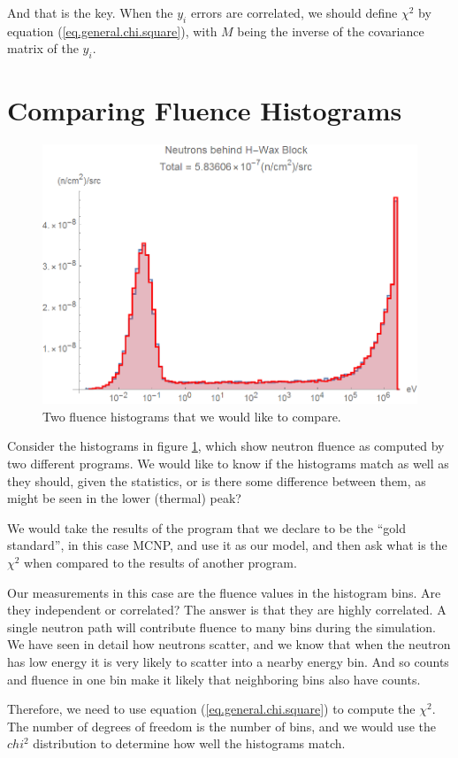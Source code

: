 \documentclass[letterpaper,12pt]{article}
\newcommand{\myMatrix}[1]{\bm{\mathit{#1}}}
\begin{document}
And that is the key. When the $y_i$ errors are correlated, we should define $\chi^2$ by equation (\ref{eq.general.chi.square}), with $\myMatrix{M}$ being the inverse of the covariance matrix of the $y_i$.

\section{Comparing Fluence Histograms}

\begin{figure}[ht] 
\centering	\includegraphics[width=0.7\columnwidth]{sn2304}
	\caption{
		\label{fig.fluence}
		Two fluence histograms that we would like to compare.
	}
\end{figure}

Consider the histograms in figure \ref{fig.fluence}, which show neutron fluence as computed by two different programs. We would like to know if the histograms match as well as they should, given the statistics, or is there some difference between them, as might be seen in the lower (thermal) peak? 

We would take the results of the program that we declare to be the ``gold standard'', in this case MCNP, and use it as our model, and then ask what is the $\chi^2$ when compared to the results of another program.

Our measurements in this case are the fluence values in the histogram bins. Are they independent or correlated? The answer is that they are highly correlated. A single neutron path will contribute fluence to many bins during the simulation. We have seen in detail how neutrons scatter, and we know that when the neutron has low energy it is very likely to scatter into a nearby energy bin. And so counts and fluence in one bin make it likely that neighboring bins also have counts.

Therefore, we need to use equation (\ref{eq.general.chi.square}) to compute the $\chi^2$. The number of degrees of freedom is the number of bins, and we would use the $chi^2$ distribution to determine how well the histograms match.
\end{document}
